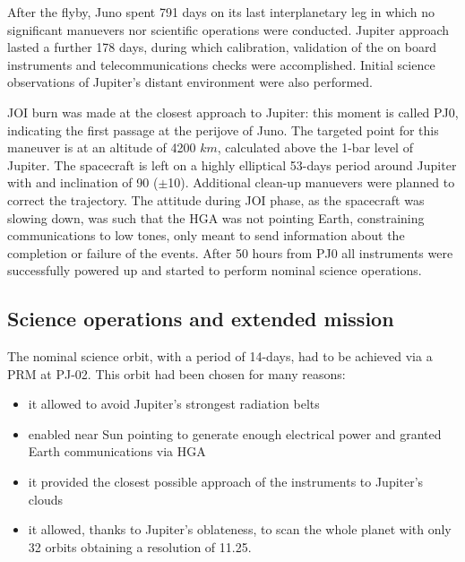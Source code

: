 After the flyby, Juno spent 791 days on its last interplanetary leg in which no significant manuevers nor scientific operations were conducted. Jupiter approach lasted a further 178 days, during which calibration, validation of the on board instruments and telecommunications checks were accomplished. Initial science observations of Jupiter's distant environment were also performed. 


JOI burn was made at the closest approach to Jupiter: this moment is called PJ0, indicating the first passage at the perijove of Juno. The targeted point for this maneuver is at an altitude of 4200 $km$, calculated above the 1-bar level of Jupiter. The spacecraft is left on a highly elliptical 53-days period around Jupiter with and inclination of 90\textdegree  \; ($\pm$10\textdegree). Additional clean-up manuevers were planned to correct the trajectory. The attitude during JOI phase, as the spacecraft was slowing down, was such that the HGA was not pointing Earth, constraining communications to low tones, only meant to send information about the completion or failure of the events. 
After 50 hours from PJ0 all instruments were successfully powered up and started to perform nominal science operations.

\subsection{Science operations and extended mission}
\label{sec: science ops}


The nominal science orbit, with a period of 14-days, had to be achieved via a PRM at PJ-02.  This orbit had been chosen for many reasons: 

\begin{itemize}
    \item it allowed to avoid Jupiter's strongest radiation belts
    \item enabled near Sun pointing to generate enough electrical power and granted Earth communications via HGA
    \item it provided the closest possible approach of the instruments to Jupiter's clouds 
    \item it allowed, thanks to Jupiter's oblateness, to scan the whole planet with only 32 orbits obtaining a resolution of 11.25\textdegree.
\end{itemize}

